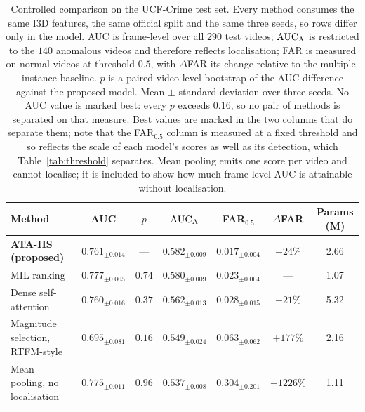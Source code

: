 \begin{table}[htbp]
\centering
\caption{Controlled comparison on the UCF-Crime test set. Every method consumes the same I3D features, the same official split and the same three seeds, so rows differ only in the model. AUC is frame-level over all $290$ test videos; $\text{AUC}_{\mathrm{A}}$ is restricted to the $140$ anomalous videos and therefore reflects localisation; FAR is measured on normal videos at threshold $0.5$, with $\Delta$FAR its change relative to the multiple-instance baseline. $p$ is a paired video-level bootstrap of the AUC difference against the proposed model. Mean $\pm$ standard deviation over three seeds. No AUC value is marked best: every $p$ exceeds $0.16$, so no pair of methods is separated on that measure. Best values are marked in the two columns that do separate them; note that the FAR$_{0.5}$ column is measured at a fixed threshold and so reflects the scale of each model's scores as well as its detection, which Table~\ref{tab:threshold} separates. Mean pooling emits one score per video and cannot localise; it is included to show how much frame-level AUC is attainable without localisation.}
\label{tab:comparison}
\small
\begin{tabular}{lcccccc}
\toprule
Method & AUC & $p$ & $\text{AUC}_{\mathrm{A}}$ & FAR$_{0.5}$ & $\Delta$FAR & Params (M) \\
\midrule
\textbf{ATA-HS (proposed)} & $0.761_{\pm0.014}$ & --- & $\mathbf{0.582}_{\pm0.009}$ & $\mathbf{0.017}_{\pm0.004}$ & $-24\%$ & 2.66 \\
\midrule
MIL ranking \citep{sultani2018real} & $0.777_{\pm0.005}$ & $0.74$ & $0.580_{\pm0.009}$ & $0.023_{\pm0.004}$ & --- & 1.07 \\
Dense self-attention & $0.760_{\pm0.016}$ & $0.37$ & $0.562_{\pm0.013}$ & $0.028_{\pm0.015}$ & $+21\%$ & 5.32 \\
Magnitude selection, RTFM-style \citep{tian2021weakly} & $0.695_{\pm0.081}$ & $0.16$ & $0.549_{\pm0.024}$ & $0.063_{\pm0.062}$ & $+177\%$ & 2.16 \\
Mean pooling, no localisation & $0.775_{\pm0.011}$ & $0.96$ & $0.537_{\pm0.008}$ & $0.304_{\pm0.201}$ & $+1226\%$ & 1.11 \\
\bottomrule
\end{tabular}
\end{table}

